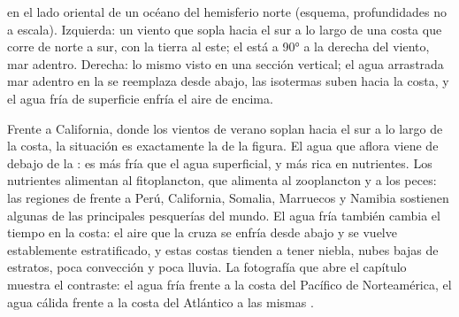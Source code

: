 \begin{omfigure}

{\small {} en el lado oriental de un océano del hemisferio norte (esquema, profundidades no a escala). Izquierda: un viento que sopla hacia el sur a lo largo de una costa que corre de norte a sur, con la tierra al este; el  está a \ang{90} a la derecha del viento, mar adentro. Derecha: lo mismo visto en una sección vertical; el agua arrastrada mar adentro en la  se reemplaza desde abajo, las isotermas suben hacia la costa, y el agua fría de superficie enfría el aire de encima.}
\label{fig:b1:ocean-circulation:upwelling}
\end{omfigure}

Frente a California, donde los vientos de verano soplan hacia el sur a lo largo de la costa, la situación es exactamente la de la figura. El agua que aflora viene de debajo de la : es más fría que el agua superficial, y más rica en nutrientes. Los nutrientes alimentan al fitoplancton, que alimenta al zooplancton y a los peces: las regiones de  frente a Perú, California, Somalia, Marruecos y Namibia sostienen algunas de las principales pesquerías del mundo. El agua fría también cambia el tiempo en la costa: el aire que la cruza se enfría desde abajo y se vuelve establemente estratificado, y estas costas tienden a tener niebla, nubes bajas de estratos, poca convección y poca lluvia. La fotografía que abre el capítulo muestra el contraste: el agua fría frente a la costa del Pacífico de Norteamérica, el agua cálida frente a la costa del Atlántico a las mismas .

